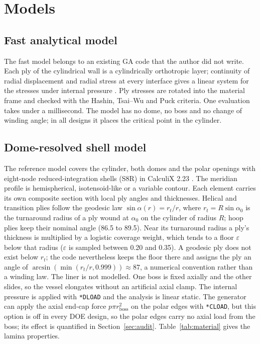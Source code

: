 \documentclass[11pt]{article}
\begin{document}
\section{Models}

\subsection{Fast analytical model}
The fast model belongs to an existing GA code that the author did not write. Each ply of the cylindrical wall is a cylindrically orthotropic layer; continuity of radial displacement and radial stress at every interface gives a linear system for the stresses under internal pressure \cite{Lekhnitskii1963}. Ply stresses are rotated into the material frame and checked with the Hashin, Tsai--Wu and Puck criteria. One evaluation takes under a millisecond. The model has no dome, no boss and no change of winding angle; in all \NdoeCases{} designs it places the critical point in the cylinder.

\subsection{Dome-resolved shell model}
The reference model covers the cylinder, both domes and the polar openings with eight-node reduced-integration shells (S8R) in CalculiX 2.23 \cite{Dhondt2024}. The meridian profile is hemispherical, isotensoid-like or a variable contour. Each element carries its own composite section with local ply angles and thicknesses. Helical and transition plies follow the geodesic law $\sin\alpha(r) = r_t/r$, where $r_t = R\sin\alpha_0$ is the turnaround radius of a ply wound at $\alpha_0$ on the cylinder of radius $R$; hoop plies keep their nominal angle (86.5 to 89.5\textdegree). Near its turnaround radius a ply's thickness is multiplied by a logistic coverage weight, which tends to a floor $\varepsilon$ below that radius ($\varepsilon$ is sampled between 0.20 and 0.35). A geodesic ply does not exist below $r_t$; the code nevertheless keeps the floor there and assigns the ply an angle of $\arcsin(\min(r_t/r, 0.999)) \approx 87$\textdegree, a numerical convention rather than a winding law. The liner is not modelled. One boss is fixed axially and the other slides, so the vessel elongates without an artificial axial clamp. The internal pressure is applied with \texttt{*DLOAD} and the analysis is linear static. The generator can apply the axial end-cap force $p\pi r_{\mathrm{boss}}^2$ on the polar edges with \texttt{*CLOAD}, but this option is off in every DOE design, so the polar edges carry no axial load from the boss; its effect is quantified in Section~\ref{sec:audit}. Table~\ref{tab:material} gives the lamina properties.
\end{document}
